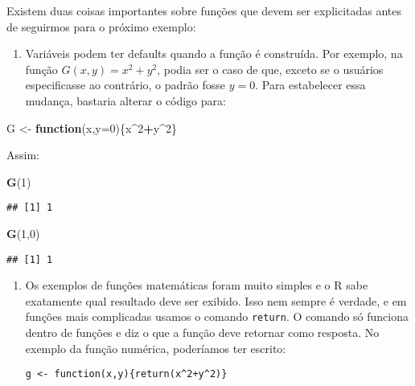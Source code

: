 \documentclass[]{book}
\newenvironment{Shaded}{\begin{snugshade}}{\end{snugshade}}
\newcommand{\KeywordTok}[1]{\textcolor[rgb]{0.13,0.29,0.53}{\textbf{#1}}}
\newcommand{\DataTypeTok}[1]{\textcolor[rgb]{0.13,0.29,0.53}{#1}}
\newcommand{\DecValTok}[1]{\textcolor[rgb]{0.00,0.00,0.81}{#1}}
\newcommand{\StringTok}[1]{\textcolor[rgb]{0.31,0.60,0.02}{#1}}
\newcommand{\ControlFlowTok}[1]{\textcolor[rgb]{0.13,0.29,0.53}{\textbf{#1}}}
\newcommand{\OperatorTok}[1]{\textcolor[rgb]{0.81,0.36,0.00}{\textbf{#1}}}
\newcommand{\NormalTok}[1]{#1}
\providecommand{\tightlist}{%
  \setlength{\itemsep}{0pt}\setlength{\parskip}{0pt}}
\begin{document}
Existem duas coisas importantes sobre funções que devem ser explicitadas
antes de seguirmos para o próximo exemplo:

\begin{enumerate}
\def\labelenumi{(\arabic{enumi})}
\setcounter{enumi}{2}
\tightlist
\item
  Variáveis podem ter defaults quando a função é construída. Por
  exemplo, na função \(G(x,y) = x^2+y^2\), podia ser o caso de que,
  exceto se o usuários especificasse ao contrário, o padrão fosse
  \(y = 0\). Para estabelecer essa mudança, bastaria alterar o código
  para:
\end{enumerate}

\begin{Shaded}
\begin{Highlighting}[]
\NormalTok{G <-}\StringTok{ }\ControlFlowTok{function}\NormalTok{(x,}\DataTypeTok{y=}\DecValTok{0}\NormalTok{)\{x}\OperatorTok{^}\DecValTok{2}\OperatorTok{+}\NormalTok{y}\OperatorTok{^}\DecValTok{2}\NormalTok{\}}
\end{Highlighting}
\end{Shaded}

Assim:

\begin{Shaded}
\begin{Highlighting}[]
\KeywordTok{G}\NormalTok{(}\DecValTok{1}\NormalTok{)}
\end{Highlighting}
\end{Shaded}

\begin{verbatim}
## [1] 1
\end{verbatim}

\begin{Shaded}
\begin{Highlighting}[]
\KeywordTok{G}\NormalTok{(}\DecValTok{1}\NormalTok{,}\DecValTok{0}\NormalTok{)}
\end{Highlighting}
\end{Shaded}

\begin{verbatim}
## [1] 1
\end{verbatim}

\begin{enumerate}
\def\labelenumi{(\arabic{enumi})}
\setcounter{enumi}{3}
\item
  Os exemplos de funções matemáticas foram muito simples e o R sabe
  exatamente qual resultado deve ser exibido. Isso nem sempre é verdade,
  e em funções mais complicadas usamos o comando \texttt{return}. O
  comando só funciona dentro de funções e diz o que a função deve
  retornar como resposta. No exemplo da função numérica, poderíamos ter
  escrito:

\begin{verbatim}
g <- function(x,y){return(x^2+y^2)}
\end{verbatim}
\end{enumerate}
\end{document}
